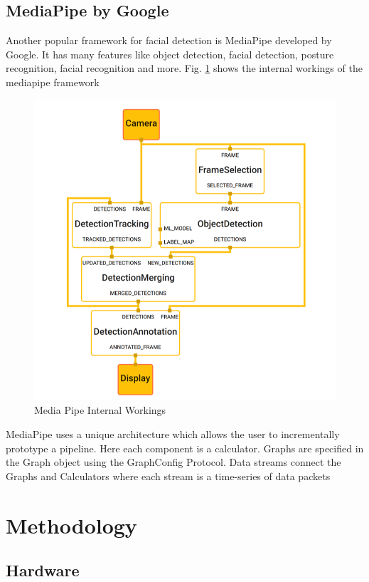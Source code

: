 \documentclass[journal]{IEEEtran}
\begin{document}
\subsection{MediaPipe by Google}
Another popular framework for facial detection is MediaPipe
developed by Google. It has many features like object
detection, facial detection, posture recognition, facial
recognition and more. Fig. \ref{internalWorkings} shows the internal workings
of the mediapipe framework \cite{mediapipe}

\begin{figure}[!ht]
	\centering
	\includegraphics[width=\linewidth]{./img/MediaPipeImplementation.png}
	\caption{Media Pipe Internal Workings}
	\label{internalWorkings}
\end{figure}
MediaPipe uses a unique architecture which allows the user to
incrementally prototype a pipeline. Here each component is a
calculator. Graphs are specified in the Graph object using the
GraphConfig Protocol. Data streams connect the Graphs and
Calculators where each stream is a time-series of data packets \cite{mediapipe}

\section{Methodology}
\subsection{Hardware}
\end{document}
